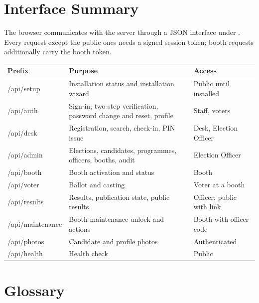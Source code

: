 \chapter{Interface Summary}

The browser communicates with the server through a JSON interface under . Every request except the public ones needs a signed session token; booth requests additionally carry the booth token.

\begin{center}
\small
\begin{tabularx}{\linewidth}{@{}>{\ttfamily}l X l@{}}
\toprule
\textrm{\textbf{Prefix}} & \textbf{Purpose} & \textbf{Access} \\
\midrule
/api/setup & Installation status and installation wizard & Public until installed \\
/api/auth & Sign-in, two-step verification, password change and reset, profile & Staff, voters \\
/api/desk & Registration, search, check-in, PIN issue & Desk, Election Officer \\
/api/admin & Elections, candidates, programmes, officers, booths, audit & Election Officer \\
/api/booth & Booth activation and status & Booth \\
/api/voter & Ballot and casting & Voter at a booth \\
/api/results & Results, publication state, public results & Officer; public with link \\
/api/maintenance & Booth maintenance unlock and actions & Booth with officer code \\
/api/photos & Candidate and profile photos & Authenticated \\
/api/health & Health check & Public \\
\bottomrule
\end{tabularx}
\end{center}

\chapter{Glossary}

